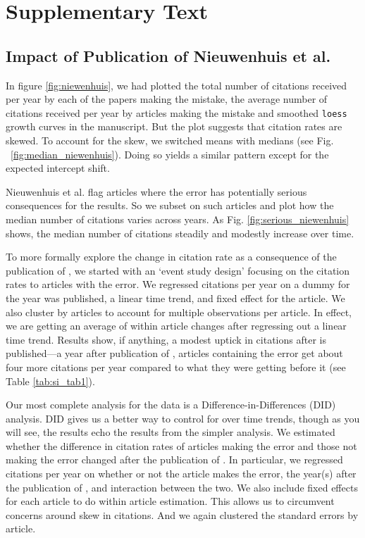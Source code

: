 \documentclass[12pt]{article}
\begin{document}
\section{Supplementary Text}

\subsection{Impact of Publication of Nieuwenhuis et al.}
In figure \ref{fig:niewenhuis}, we had plotted the total number of citations received per year by each of the papers making the mistake, the average number of citations received per year by articles making the mistake and smoothed \texttt{loess} growth curves in the manuscript. But the plot suggests that citation rates are skewed. To account for the skew, we switched means with medians (see Fig. ~\ref{fig:median_niewenhuis}). Doing so yields a similar pattern except for the expected intercept shift.

Nieuwenhuis et al. \cite{nieuwenhuis2011} flag articles where the error has potentially serious consequences for the results. So we subset on such articles and plot how the median number of citations varies across years. As Fig. \ref{fig:serious_niewenhuis} shows, the median number of citations steadily and modestly increase over time.

To more formally explore the change in citation rate as a consequence of the publication of \cite{nieuwenhuis2011}, we started with an `event study design' focusing on the citation rates to articles with the error. We regressed citations per year on a dummy for the year \cite{nieuwenhuis2011} was published, a linear time trend, and fixed effect for the article. We also cluster by articles to account for multiple observations per article. In effect, we are getting an average of within article changes after regressing out a linear time trend. Results show, if anything, a modest uptick in citations after \cite{nieuwenhuis2011} is published---a year after publication of \cite{nieuwenhuis2011}, articles containing the error get about four more citations per year compared to what they were getting before it (see Table \ref{tab:si_tab1}).

Our most complete analysis for the \cite{nieuwenhuis2011} data is a Difference-in-Differences (DID) analysis. DID gives us a better way to control for over time trends, though as you will see, the results echo the results from the simpler analysis. We estimated whether the difference in citation rates of articles making the error and those not making the error changed after the publication of \cite{nieuwenhuis2011}. In particular, we regressed citations per year on whether or not the article makes the error, the year(s) after the publication of \cite{nieuwenhuis2011}, and interaction between the two. We also include fixed effects for each article to do within article estimation. This allows us to circumvent concerns around skew in citations. And we again clustered the standard errors by article. 
\end{document}
